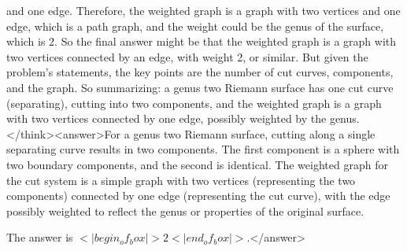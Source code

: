 and one edge. Therefore, the weighted graph is a graph with two vertices and one edge, which is a path graph, and the weight could be the genus of the surface, which is 2. So the final answer might be that the weighted graph is a graph with two vertices connected by an edge, with weight 2, or similar. But given the problem's statements, the key points are the number of cut curves, components, and the graph. So summarizing: a genus two Riemann surface has one cut curve (separating), cutting into two components, and the weighted graph is a graph with two vertices connected by one edge, possibly weighted by the genus.</think><answer>For a genus two Riemann surface, cutting along a single separating curve results in two components. The first component is a sphere with two boundary components, and the second is identical. The weighted graph for the cut system is a simple graph with two vertices (representing the two components) connected by one edge (representing the cut curve), with the edge possibly weighted to reflect the genus or properties of the original surface.  

The answer is \(<|begin_of_box|>2<|end_of_box|>\).</answer>